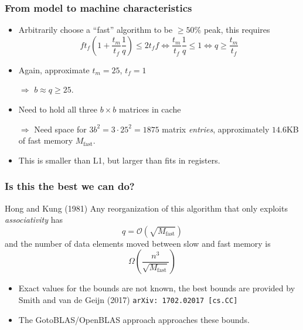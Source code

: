 \documentclass[dvipsnames,presentation,aspectratio=169,14pt]{beamer}
\begin{document}
\begin{frame}
  \frametitle{From model to machine characteristics}
  \begin{itemize}
  \item Arbitrarily choose a ``fast'' algorithm to be $\ge 50\%$ peak,
    this requires
    \begin{equation*}
      f t_f \left(1 + \frac{t_m}{t_f}\frac{1}{q}\right) \le 2 t_f f \Leftrightarrow \frac{t_m}{t_f}\frac{1}{q} \le 1
      \Leftrightarrow q \ge \frac{t_m}{t_f}
    \end{equation*}
  \item Again, approximate $t_m = 25$, $t_f = 1$
  \item[$\Rightarrow$] $b \approx q \ge 25$.
  \item Need to hold all three $b \times b$ matrices in cache

  \item[$\Rightarrow$] Need space for $3 b^2 = 3 \cdot 25^2 = 1875$
    matrix \emph{entries}, approximately $14.6$KB of fast memory $M_\text{fast}$.
  \item This is smaller than L1, but larger than fits in registers.
  \end{itemize}
\end{frame}

\begin{frame}
  \frametitle{Is this the best we can do?}
  \begin{theorem}{Hong and Kung (1981)}
    Any reorganization of this algorithm that only exploits
    \emph{associativity} has
    \begin{equation*}
      q = \mathcal{O}(\sqrt{M_\text{fast}})
    \end{equation*}
    and the number of data elements moved between slow and fast memory
    is
    \begin{equation*}
      \Omega\left(\frac{n^3}{\sqrt{M_\text{fast}}}\right)
    \end{equation*}
  \end{theorem}

  \begin{itemize}
  \item Exact values for the bounds are not known, the best bounds are
    provided by Smith and van de Geijn (2017) \texttt{arXiv:
      1702.02017 [cs.CC]}
  \item The GotoBLAS/OpenBLAS approach approaches these bounds.
  \end{itemize}
\end{frame}
\end{document}
